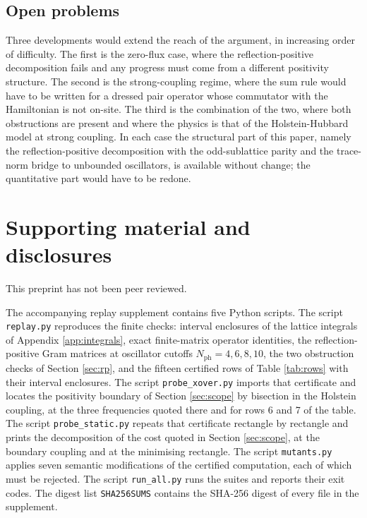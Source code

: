\documentclass[11pt]{article}
\numberwithin{equation}{section}
\newcommand{\fN}{N_{\mathrm{ph}}}
\theoremstyle{definition}
\begin{document}
\subsection{Open problems}

Three developments would extend the reach of the argument, in increasing order of
difficulty. The first is the zero-flux case, where the reflection-positive decomposition
fails and any progress must come from a different positivity structure. The second is the
strong-coupling regime, where the sum rule would have to be written for a dressed pair
operator whose commutator with the Hamiltonian is not on-site. The third is the
combination of the two, where both obstructions are present and where the physics is that
of the Holstein-Hubbard model at strong coupling. In each case the structural part of this
paper, namely the reflection-positive decomposition with the odd-sublattice parity and the
trace-norm bridge to unbounded oscillators, is available without change; the quantitative
part would have to be redone.

\section{Supporting material and disclosures}\label{sec:supp}

This preprint has not been peer reviewed.

The accompanying replay supplement contains five Python scripts. The script
\texttt{replay.py} reproduces the finite checks: interval enclosures of the lattice
integrals of Appendix \ref{app:integrals}, exact finite-matrix operator identities, the
reflection-positive Gram matrices at oscillator cutoffs $\fN=4,6,8,10$, the two
obstruction checks of Section \ref{sec:rp}, and the fifteen certified rows of Table
\ref{tab:rows} with their interval enclosures. The script \texttt{probe\_xover.py} imports
that certificate and locates the positivity boundary of Section \ref{sec:scope} by
bisection in the Holstein coupling, at the three frequencies quoted there and for rows 6
and 7 of the table. The script \texttt{probe\_static.py} repeats that certificate rectangle
by rectangle and prints the decomposition of the cost quoted in Section \ref{sec:scope},
at the boundary coupling and at the minimising rectangle. The script \texttt{mutants.py}
applies seven semantic modifications of
the certified computation, each of which must be rejected. The script \texttt{run\_all.py}
runs the suites and reports their exit codes. The digest list \texttt{SHA256SUMS} contains
the SHA-256 digest of every file in the supplement.
\end{document}
